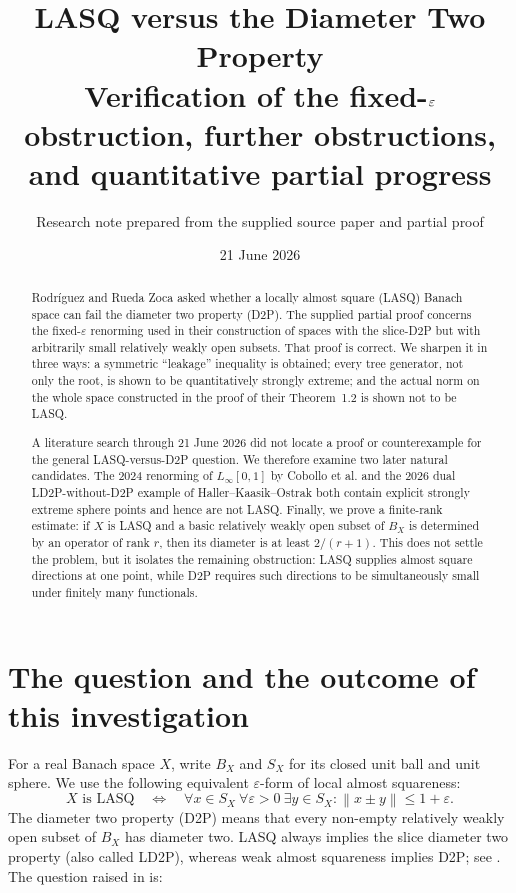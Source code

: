 \documentclass[11pt]{article}
\title{LASQ versus the Diameter Two Property\\
\large Verification of the fixed-$\eps$ obstruction, further obstructions, and quantitative partial progress}
\author{Research note prepared from the supplied source paper and partial proof}
\date{21 June 2026}
\newcommand{\eps}{\varepsilon}
\newcommand{\norm}[1]{\left\lVert #1\right\rVert}
\begin{document}
\maketitle

\begin{abstract}
Rodr\'iguez and Rueda Zoca asked whether a locally almost square (LASQ) Banach space can fail the diameter two property (D2P).  The supplied partial proof concerns the fixed-$\eps$ renorming used in their construction of spaces with the slice-D2P but with arbitrarily small relatively weakly open subsets.  That proof is correct.  We sharpen it in three ways: a symmetric ``leakage'' inequality is obtained; every tree generator, not only the root, is shown to be quantitatively strongly extreme; and the actual norm on the whole space constructed in the proof of their Theorem~1.2 is shown not to be LASQ.

A literature search through 21 June 2026 did not locate a proof or counterexample for the general LASQ-versus-D2P question.  We therefore examine two later natural candidates.  The 2024 renorming of $L_\infty[0,1]$ by Cobollo et al. and the 2026 dual LD2P-without-D2P example of Haller--Kaasik--Ostrak both contain explicit strongly extreme sphere points and hence are not LASQ.  Finally, we prove a finite-rank estimate: if $X$ is LASQ and a basic relatively weakly open subset of $B_X$ is determined by an operator of rank $r$, then its diameter is at least $2/(r+1)$.  This does not settle the problem, but it isolates the remaining obstruction: LASQ supplies almost square directions at one point, while D2P requires such directions to be simultaneously small under finitely many functionals.
\end{abstract}

\tableofcontents

\section{The question and the outcome of this investigation}

For a real Banach space $X$, write $B_X$ and $S_X$ for its closed unit ball and unit sphere.  We use the following equivalent $\eps$-form of local almost squareness:
\[
 X \text{ is LASQ}
 \quad\Longleftrightarrow\quad
 \forall x\in S_X\ \forall\eps>0\ \exists y\in S_X:
 \norm{x\pm y}\le 1+\eps.
\]
The diameter two property (D2P) means that every non-empty relatively weakly open subset of $B_X$ has diameter two.  LASQ always implies the slice diameter two property (also called LD2P), whereas weak almost squareness implies D2P; see \cite{ALL2016}.  The question raised in \cite{RodriguezRueda2023} is:
\end{document}
